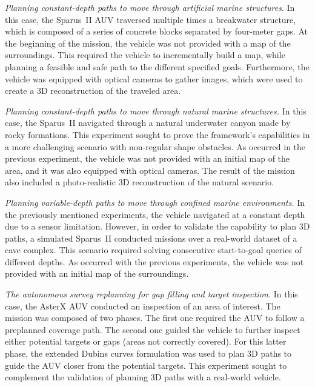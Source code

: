 \begin{inparaenum}[1)]
\item \textit{Planning constant-depth paths to move through artificial marine
structures}. In this case, the Sparus~II \ac{AUV} traversed multiple times a
breakwater structure, which is composed of a series of concrete blocks separated
by four-meter gaps. At the beginning of the mission, the vehicle was not
provided with a map of the surroundings. This required the vehicle to
incrementally build a map, while planning a feasible and safe path to the
different specified goals. Furthermore, the vehicle was equipped with optical
cameras to gather images, which were used to create a \ac{3D} reconstruction of
the traveled area.

\item \textit{Planning constant-depth paths to move through natural marine
structures.} In this case, the Sparus~II navigated through a natural underwater
canyon made by rocky formations. This experiment sought to prove the
framework's capabilities in a more challenging scenario with non-regular shape
obstacles. As occurred in the previous experiment, the vehicle was not provided
with an initial map of the area, and it was also equipped with optical cameras.
The result of the mission also included a photo-realistic \ac{3D} reconstruction
of the natural scenario.

\item \textit{Planning variable-depth paths to move through confined marine
environments.} In the previously mentioned experiments, the vehicle navigated at
a constant depth due to a sensor limitation. However, in order to validate the
capability to plan \ac{3D} paths, a simulated Sparus~II conducted missions over
a real-world dataset of a cave complex. This scenario required solving
consecutive start-to-goal queries of different depths. As occurred with the
previous experiments, the vehicle was not provided with an initial map of the
surroundings.

\item \textit{The autonomous survey replanning for gap filling and target
inspection.} In this case, the AsterX \ac{AUV} conducted an inspection of an
area of interest. The mission was composed of two phases. The first one required
the \ac{AUV} to follow a preplanned coverage path. The second one guided the
vehicle to further inspect either potential targets or gaps (\ie areas not
correctly covered). For this latter phase, the extended Dubins curves
formulation was used to plan \ac{3D} paths to guide the \ac{AUV} closer from the
potential targets. This experiment sought to complement the validation of
planning \ac{3D} paths with a real-world vehicle.
\end{inparaenum}

